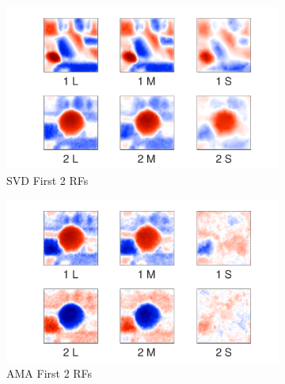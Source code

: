 \documentclass{jov}
\begin{document}
\begin{figure}
\centering
\begin{subfigure}[b]{0.27 \textwidth}
		\centering
        \includegraphics[width=\textwidth]{../Figures/Figure12/Figure12_a.pdf}
        \caption{SVD First 2 RFs}
        \label{fig:case10SVD}
    \end{subfigure}
    \begin{subfigure}[b]{0.27 \textwidth}   
        \includegraphics[width=\textwidth]{../Figures/Figure12/Figure12_b.pdf}
        \caption{AMA First 2 RFs}
        \label{fig:case10AMA}
    \end{subfigure}
        \begin{subfigure}[b]{0.20 \textwidth}

\end{subfigure}
\end{figure}
\end{document}
